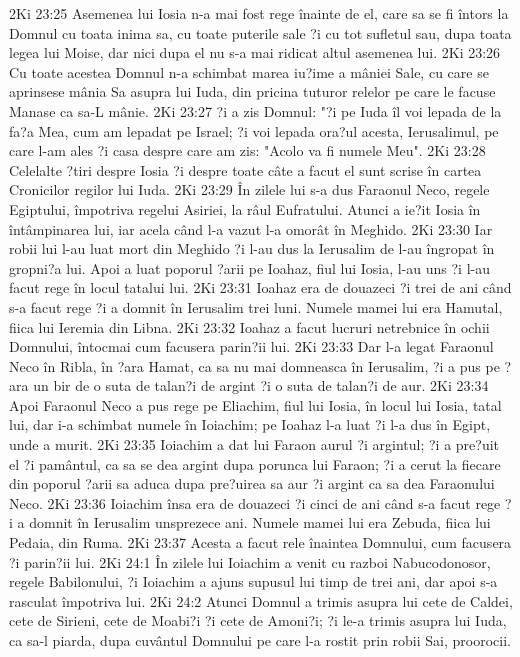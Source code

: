 2Ki 23:25  Asemenea lui Iosia n-a mai fost rege înainte de el, care sa se fi întors la Domnul cu toata inima sa, cu toate puterile sale ?i cu tot sufletul sau, dupa toata legea lui Moise, dar nici dupa el nu s-a mai ridicat altul asemenea lui.
2Ki 23:26  Cu toate acestea Domnul n-a schimbat marea iu?ime a mâniei Sale, cu care se aprinsese mânia Sa asupra lui Iuda, din pricina tuturor relelor pe care le facuse Manase ca sa-L mânie.
2Ki 23:27  ?i a zis Domnul: "?i pe Iuda îl voi lepada de la fa?a Mea, cum am lepadat pe Israel; ?i voi lepada ora?ul acesta, Ierusalimul, pe care l-am ales ?i casa despre care am zis: "Acolo va fi numele Meu".
2Ki 23:28  Celelalte ?tiri despre Iosia ?i despre toate câte a facut el sunt scrise în cartea Cronicilor regilor lui Iuda.
2Ki 23:29  În zilele lui s-a dus Faraonul Neco, regele Egiptului, împotriva regelui Asiriei, la râul Eufratului. Atunci a ie?it Iosia în întâmpinarea lui, iar acela când l-a vazut l-a omorât în Meghido.
2Ki 23:30  Iar robii lui l-au luat mort din Meghido ?i l-au dus la Ierusalim de l-au îngropat în gropni?a lui. Apoi a luat poporul ?arii pe Ioahaz, fiul lui Iosia, l-au uns ?i l-au facut rege în locul tatalui lui.
2Ki 23:31  Ioahaz era de douazeci ?i trei de ani când s-a facut rege ?i a domnit în Ierusalim trei luni. Numele mamei lui era Hamutal, fiica lui Ieremia din Libna.
2Ki 23:32  Ioahaz a facut lucruri netrebnice în ochii Domnului, întocmai cum facusera parin?ii lui.
2Ki 23:33  Dar l-a legat Faraonul Neco în Ribla, în ?ara Hamat, ca sa nu mai domneasca în Ierusalim, ?i a pus pe ?ara un bir de o suta de talan?i de argint ?i o suta de talan?i de aur.
2Ki 23:34  Apoi Faraonul Neco a pus rege pe Eliachim, fiul lui Iosia, în locul lui Iosia, tatal lui, dar i-a schimbat numele în Ioiachim; pe Ioahaz l-a luat ?i l-a dus în Egipt, unde a murit.
2Ki 23:35  Ioiachim a dat lui Faraon aurul ?i argintul; ?i a pre?uit el ?i pamântul, ca sa se dea argint dupa porunca lui Faraon; ?i a cerut la fiecare din poporul ?arii sa aduca dupa pre?uirea sa aur ?i argint ca sa dea Faraonului Neco.
2Ki 23:36  Ioiachim însa era de douazeci ?i cinci de ani când s-a facut rege ?i a domnit în Ierusalim unsprezece ani. Numele mamei lui era Zebuda, fiica lui Pedaia, din Ruma.
2Ki 23:37  Acesta a facut rele înaintea Domnului, cum facusera ?i parin?ii lui.
2Ki 24:1  În zilele lui Ioiachim a venit cu razboi Nabucodonosor, regele Babilonului, ?i Ioiachim a ajuns supusul lui timp de trei ani, dar apoi s-a rasculat împotriva lui.
2Ki 24:2  Atunci Domnul a trimis asupra lui cete de Caldei, cete de Sirieni, cete de Moabi?i ?i cete de Amoni?i; ?i le-a trimis asupra lui Iuda, ca sa-l piarda, dupa cuvântul Domnului pe care l-a rostit prin robii Sai, proorocii.
